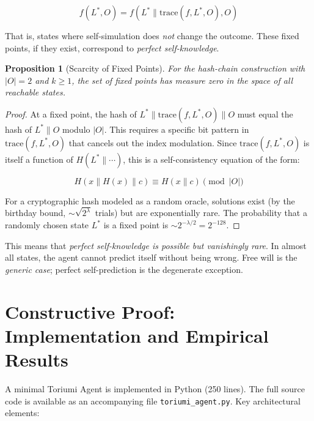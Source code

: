 \documentclass[12pt,a4paper]{article}
\newtheorem{proposition}[theorem]{Proposition}
\theoremstyle{definition}
\theoremstyle{remark}
\begin{document}
\begin{equation}
f(L^*, O) = f(L^* \parallel \text{trace}(f, L^*, O), O)
\end{equation}

That is, states where self-simulation does \emph{not} change the outcome. These
fixed points, if they exist, correspond to \emph{perfect self-knowledge}.

\begin{proposition}[Scarcity of Fixed Points]
For the hash-chain construction with $|O| = 2$ and $k \geq 1$, the set of
fixed points has measure zero in the space of all reachable states.
\end{proposition}

\begin{proof}
At a fixed point, the hash of $L^* \parallel \text{trace}(f, L^*, O) \parallel O$
must equal the hash of $L^* \parallel O$ modulo $|O|$. This requires a specific
bit pattern in $\text{trace}(f, L^*, O)$ that cancels out the index modulation.
Since $\text{trace}(f, L^*, O)$ is itself a function of $H(L^* \parallel \cdots)$,
this is a self-consistency equation of the form:

\begin{equation}
H(x \parallel H(x) \parallel c) \equiv H(x \parallel c) \pmod{|O|}
\end{equation}

For a cryptographic hash modeled as a random oracle, solutions exist
(by the birthday bound, $\sim \sqrt{2^\lambda}$ trials) but are
exponentially rare. The probability that a randomly chosen state $L^*$
is a fixed point is $\sim 2^{-\lambda/2} = 2^{-128}$.
\end{proof}

This means that \emph{perfect self-knowledge is possible but vanishingly rare}.
In almost all states, the agent cannot predict itself without being wrong.
Free will is the \emph{generic case}; perfect self-prediction is the
degenerate exception.

\section{Constructive Proof: Implementation and Empirical Results}
\label{sec:empirical}

A minimal Toriumi Agent is implemented in Python (250 lines). The full
source code is available as an accompanying file \texttt{toriumi\_agent.py}.
Key architectural elements:
\end{document}

